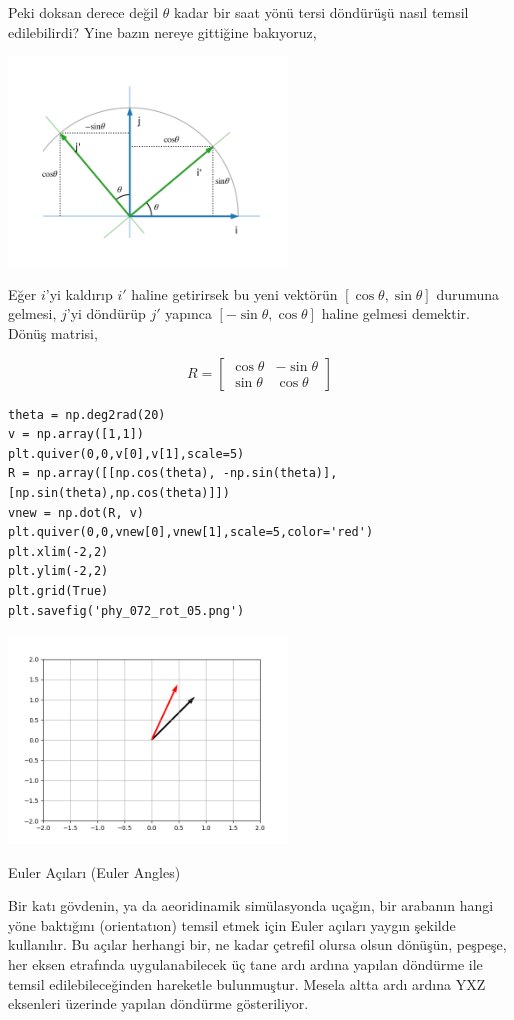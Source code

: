 \documentclass[12pt,fleqn]{article}\usepackage{../../common}
\begin{document}
Peki doksan derece değil $\theta$ kadar bir saat yönü tersi döndürüşü
nasıl temsil edilebilirdi? Yine bazın nereye gittiğine bakıyoruz,

\includegraphics[width=20em]{phy_072_rot_03.png}

Eğer $i$'yi kaldırıp $i'$ haline getirirsek bu yeni vektörün
$[\cos\theta,\sin\theta]$ durumuna gelmesi, $j$'yi döndürüp $j'$ yapınca
$[-\sin\theta,\cos\theta]$ haline gelmesi demektir. Dönüş matrisi,

$$
R = \left[\begin{array}{rr}
\cos\theta & -\sin\theta \\
\sin\theta & \cos\theta
\end{array}\right]
$$

\begin{verbatim}
theta = np.deg2rad(20)
v = np.array([1,1])
plt.quiver(0,0,v[0],v[1],scale=5)
R = np.array([[np.cos(theta), -np.sin(theta)],[np.sin(theta),np.cos(theta)]])
vnew = np.dot(R, v)
plt.quiver(0,0,vnew[0],vnew[1],scale=5,color='red')
plt.xlim(-2,2)
plt.ylim(-2,2)
plt.grid(True)
plt.savefig('phy_072_rot_05.png')
\end{verbatim}

\includegraphics[width=20em]{phy_072_rot_05.png}

Euler Açıları (Euler Angles)

Bir katı gövdenin, ya da aeoridinamik simülasyonda uçağın, bir arabanın hangi
yöne baktığını (orientatıon) temsil etmek için Euler açıları yaygın şekilde
kullanılır. Bu açılar herhangi bir, ne kadar çetrefil olursa olsun dönüşün,
peşpeşe, her eksen etrafında uygulanabilecek üç tane ardı ardına yapılan
döndürme  ile temsil edilebileceğinden hareketle bulunmuştur. Mesela altta
ardı ardına YXZ eksenleri üzerinde yapılan döndürme gösteriliyor.
\end{document}
